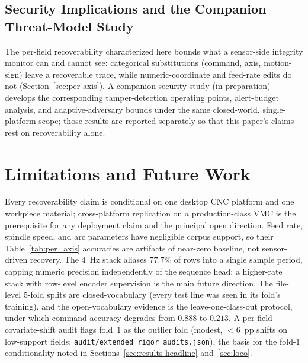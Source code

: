 \documentclass[conference]{IEEEtran}
\begin{document}
\subsection{Security Implications and the Companion Threat-Model Study}
\label{sec:disc-threat-model}

The per-field recoverability characterized here bounds what a sensor-side integrity monitor can and cannot see: categorical substitutions (command, axis, motion-sign) leave a recoverable trace, while numeric-coordinate and feed-rate edits do not (Section~\ref{sec:per-axis}). A companion security study (in preparation) develops the corresponding tamper-detection operating points, alert-budget analysis, and adaptive-adversary bounds under the same closed-world, single-platform scope; those results are reported separately so that this paper's claims rest on recoverability alone.

\section{Limitations and Future Work}
\label{sec:future}\label{sec:lim-dataset}\label{sec:lim-method}\label{sec:lim-power}\label{sec:lim-covariate}\label{sec:roadmap}

Every recoverability claim is conditional on one desktop CNC platform and one workpiece material; cross-platform replication on a production-class VMC is the prerequisite for any deployment claim and the principal open direction. Feed rate, spindle speed, and arc parameters have negligible corpus support, so their Table~\ref{tab:per_axis} accuracies are artifacts of near-zero baseline, not sensor-driven recovery. The 4~Hz stack aliases $77.7\%$ of rows into a single sample period, capping numeric precision independently of the sequence head; a higher-rate stack with row-level encoder supervision is the main future direction. The file-level 5-fold splits are closed-vocabulary (every test line was seen in its fold's training), and the open-vocabulary evidence is the leave-one-class-out protocol, under which command accuracy degrades from $0.888$ to $0.213$. A per-field covariate-shift audit flags fold~1 as the outlier fold (modest, $<\!6$~pp shifts on low-support fields; \texttt{audit/extended\_rigor\_audits.json}), the basis for the fold-1 conditionality noted in Sections~\ref{sec:results-headline} and~\ref{sec:loco}.

\end{document}
